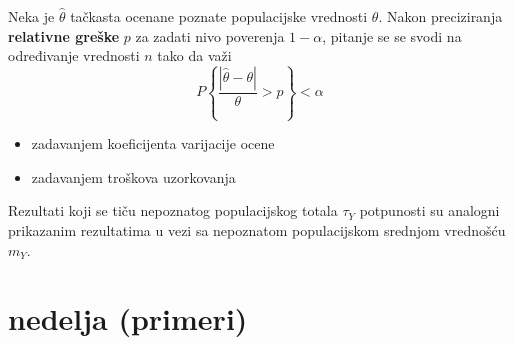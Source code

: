 \documentclass[10pt,a4paper,]{article}
\begin{document}
Neka je $\hat{\theta}$ tačkasta ocenane poznate populacijske vrednosti $\theta$.
Nakon preciziranja \textbf{relativne 
greške} $p$ za zadati nivo poverenja $1-\alpha$, 
pitanje se se svodi na određivanje vrednosti $n$ tako da 
važi
$$ P\left\{\frac{|\hat{\theta} - \theta|}{\theta} > p \right\} < \alpha$$
\begin{itemize}
\item zadavanjem koeficijenta varijacije ocene
\item zadavanjem troškova uzorkovanja
\end{itemize}

Rezultati koji se tiču nepoznatog populacijskog totala $\tau_Y$ potpunosti su 
analogni prikazanim rezultatima u vezi sa nepoznatom 
populacijskom srednjom vrednošću $m_Y$.



\section{nedelja (primeri)}
\end{document}
